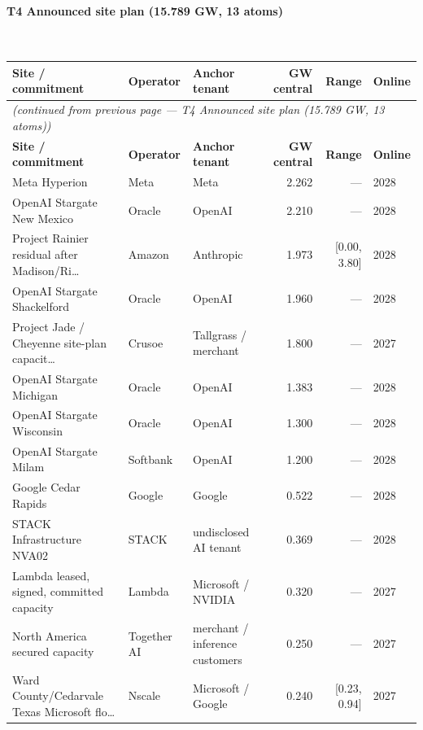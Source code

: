 \documentclass[11pt,a4paper]{article}
\begin{document}
\paragraph{\textbf{T4 Announced site plan (15.789 GW, 13 atoms)}}~\\[0.3em]
\noindent\begin{small}
\begin{longtable}{@{}p{4.5cm} p{2.4cm} p{2.4cm} r r p{1.8cm}@{}}
\toprule
\textbf{Site / commitment} & \textbf{Operator} & \textbf{Anchor tenant} & \textbf{GW central} & \textbf{Range} & \textbf{Online} \\
\midrule
\endfirsthead
\multicolumn{6}{l}{\textit{(continued from previous page — T4 Announced site plan (15.789 GW, 13 atoms))}} \\
\toprule
\textbf{Site / commitment} & \textbf{Operator} & \textbf{Anchor tenant} & \textbf{GW central} & \textbf{Range} & \textbf{Online} \\
\midrule
\endhead
\bottomrule
\endfoot

Meta Hyperion & Meta & Meta & 2.262 & — & 2028 \\

OpenAI Stargate New Mexico & Oracle & OpenAI & 2.210 & — & 2028 \\

Project Rainier residual after Madison/Ri… & Amazon & Anthropic & 1.973 & [0.00, 3.80] & 2028 \\

OpenAI Stargate Shackelford & Oracle & OpenAI & 1.960 & — & 2028 \\

Project Jade / Cheyenne site-plan capacit… & Crusoe & Tallgrass / merchant & 1.800 & — & 2027 \\

OpenAI Stargate Michigan & Oracle & OpenAI & 1.383 & — & 2028 \\

OpenAI Stargate Wisconsin & Oracle & OpenAI & 1.300 & — & 2028 \\

OpenAI Stargate Milam & Softbank & OpenAI & 1.200 & — & 2028 \\

Google Cedar Rapids & Google & Google & 0.522 & — & 2028 \\

STACK Infrastructure NVA02 & STACK & undisclosed AI tenant & 0.369 & — & 2028 \\

Lambda leased, signed, committed capacity & Lambda & Microsoft / NVIDIA & 0.320 & — & 2027 \\

North America secured capacity & Together AI & merchant / inference customers & 0.250 & — & 2027 \\

Ward County/Cedarvale Texas Microsoft flo… & Nscale & Microsoft / Google & 0.240 & [0.23, 0.94] & 2027 \\

\end{longtable}\end{small}
\end{document}
